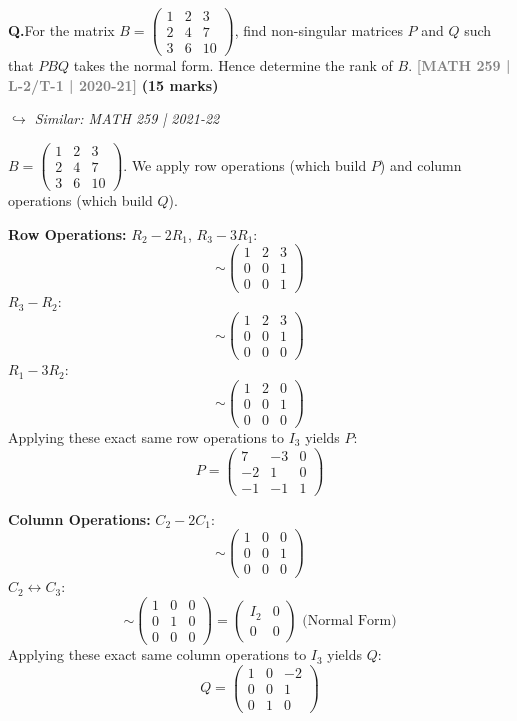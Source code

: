 \documentclass[12pt,a3paper]{article}
\newcommand{\yr}[1]{\hfill\textcolor{gray}{\small\textbf{[#1]}}}
\newcommand{\mk}[1]{\textcolor{orange!70!black}{\small\textbf{(#1 marks)}}}
\newcommand{\variant}[1]{\par\vspace{1pt}\textcolor{blue!50!black}%
  {\footnotesize\textit{$\hookrightarrow$ Similar: #1}}}
\newcounter{qnum}
\newcommand{\Q}[1]{%
  \needspace{4\baselineskip}
  \refstepcounter{qnum}
  \vspace{6pt}
  \noindent\textbf{Q\theqnum.}\enspace #1\par
}
\begin{document}
\Q{For the matrix $B = \begin{pmatrix} 1 & 2 & 3 \\ 2 & 4 & 7 \\ 3 & 6 & 10 \end{pmatrix}$, find non-singular matrices $P$ and $Q$ such that $PBQ$ takes the normal form. Hence determine the rank of $B$.
\yr{MATH 259 | L-2/T-1 | 2020-21} \mk{15}
\variant{MATH 259 | 2021-22}}
\begin{tcolorbox}[enhanced,breakable,
  colback=cB!4,colframe=cB,boxrule=0.8pt,arc=5pt,
  title={\textbf{Answer --- Normal Form of $B$; Rank, $P$ and $Q$}},
  fonttitle=\bfseries\color{white},colbacktitle=cB]

$B = \begin{pmatrix}1&2&3\\2&4&7\\3&6&10\end{pmatrix}$. We apply row operations (which build $P$) and column operations (which build $Q$).

\textbf{Row Operations:}
$R_2-2R_1$, $R_3-3R_1$:
\[
\sim \begin{pmatrix}1&2&3\\0&0&1\\0&0&1\end{pmatrix}
\]
$R_3-R_2$:
\[
\sim \begin{pmatrix}1&2&3\\0&0&1\\0&0&0\end{pmatrix}
\]
$R_1-3R_2$:
\[
\sim \begin{pmatrix}1&2&0\\0&0&1\\0&0&0\end{pmatrix}
\]
Applying these exact same row operations to $I_3$ yields $P$:
\[
P = \begin{pmatrix}7&-3&0\\-2&1&0\\-1&-1&1\end{pmatrix}
\]

\textbf{Column Operations:}
$C_2-2C_1$:
\[
\sim \begin{pmatrix}1&0&0\\0&0&1\\0&0&0\end{pmatrix}
\]
$C_2\leftrightarrow C_3$:
\[
\sim \begin{pmatrix}1&0&0\\0&1&0\\0&0&0\end{pmatrix} = \begin{pmatrix}I_2&0\\0&0\end{pmatrix} \text{ (Normal Form)}
\]
Applying these exact same column operations to $I_3$ yields $Q$:
\[
Q = \begin{pmatrix}1&0&-2\\0&0&1\\0&1&0\end{pmatrix}
\]


\end{tcolorbox}
\end{document}

